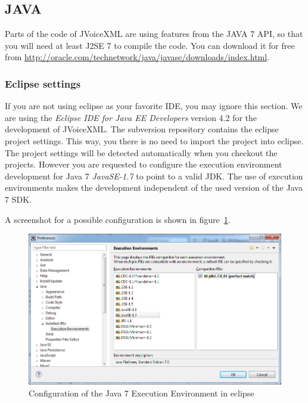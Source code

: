 \documentclass[11pt,a4paper]{article}
\begin{document}
\subsection{JAVA}
\label{sec:java}

Parts of the code of JVoiceXML are using features from the JAVA 7 API, so that
you will need at least J2SE 7 to compile the code. You can download it
for free from \url{http://oracle.com/technetwork/java/javase/downloads/index.html}.


\subsubsection{Eclipse settings}
\label{sec:eclipse}

If you are not using eclipse as your favorite IDE, you may ignore this section.
We are using the \emph{Eclipse IDE for Java EE Developers} version 4.2 for
the development of JVoiceXML. The subversion repository contains the eclipse
project settings. This way, you there is no need to import the
project into eclipse. The project settings will be detected 
automatically when you checkout the projects. However you are requested to configure the execution
environment development for Java 7 \emph{JavaSE-1.7} to point to a valid JDK.
The use of execution environments makes the development independent of the
used version of the Java 7 SDK.

A screenshot for a possible configuration is shown in
figure~\ref{fig:eclipse-execution-environments}.
\begin{figure}
\includegraphics[width=\linewidth]{eclipse-execution-environments}
\caption{Configuration of the Java 7 Execution Environment in eclipse}
\label{fig:eclipse-execution-environments}
\end{figure}
\end{document}
